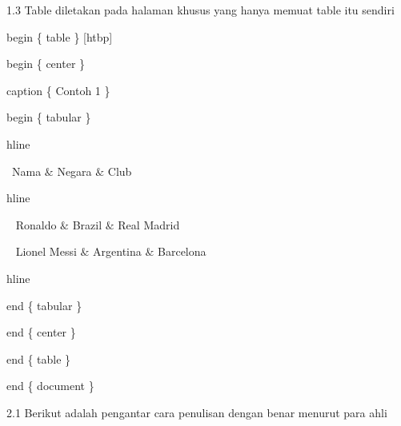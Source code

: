 1.3 Table diletakan pada halaman khusus yang hanya memuat table itu sendiri\par

begin \{ table \} [htbp]\par
begin \{ center \} \par
caption \{ Contoh 1 \} \par

begin \{ tabular \} \par

hline\par

 Nama $\&$ Negara $\&$ Club\par

hline\par

  Ronaldo $\&$ Brazil $\&$ Real Madrid \par

  Lionel Messi $\&$ Argentina $\&$ Barcelona\par

hline\par

end \{ tabular \} \par

end \{ center \} \par

end \{ table \} \par

end \{ document \} \par

2.1 Berikut adalah pengantar cara penulisan dengan benar menurut para ahli\par

